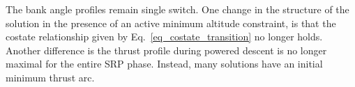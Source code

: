 \documentclass[]{article}
\begin{document}
The bank angle profiles remain single switch. One change in the structure of the solution in the presence of an active minimum altitude constraint, is that the costate relationship given by Eq.~\ref{eq_costate_transition} no longer holds. 
Another difference is the thrust profile during powered descent is no longer maximal for the entire SRP phase. Instead, many solutions have an initial minimum thrust arc.  
%
%
%
%



\end{document}
